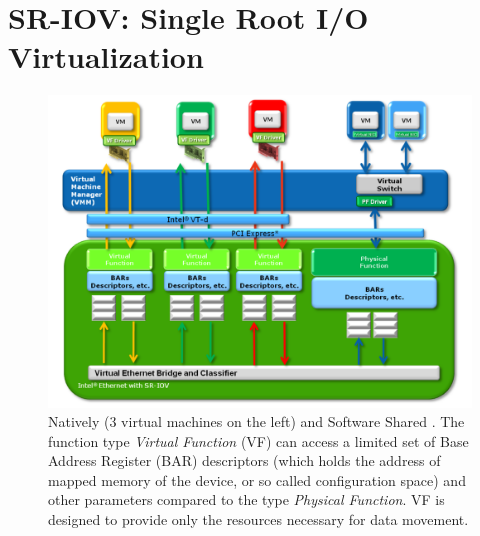 \section{SR-IOV: Single Root I/O Virtualization}
\begin{figure}[H]
	\centering
	\includegraphics[width=1.0\textwidth]{resources/images/intel_sriov_Natively_and_Software_Shared.PNG}
	\caption{Natively (3 virtual machines on the left) and Software Shared \cite{intel_sriov}. The function type \textit{Virtual Function} (VF) can access a limited set of Base Address Register (BAR) descriptors (which holds the address of mapped memory of the device, or so called configuration space) and other parameters compared to the type \textit{Physical Function}. VF is designed to provide only the resources necessary for data movement.}
    \label{fig:sota:intel_sriov_Natively_and_Software_Shared}
\end{figure}

